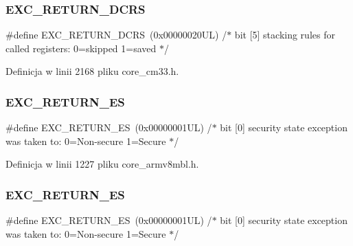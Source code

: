\subsubsection{\texorpdfstring{E\+X\+C\+\_\+\+R\+E\+T\+U\+R\+N\+\_\+\+D\+C\+RS}{EXC\_RETURN\_DCRS}\hspace{0.1cm}{\footnotesize\ttfamily [4/4]}}
{\footnotesize\ttfamily \#define E\+X\+C\+\_\+\+R\+E\+T\+U\+R\+N\+\_\+\+D\+C\+RS~(0x00000020\+U\+L)     /$\ast$ bit \mbox{[}5\mbox{]} stacking rules for called registers\+: 0=skipped 1=saved       $\ast$/}



Definicja w linii 2168 pliku core\+\_\+cm33.\+h.

\mbox{\label{group___c_m_s_i_s___core___n_v_i_c_functions_gac939dbf69d3063c76a28516a4ae84db7}} 
\subsubsection{\texorpdfstring{E\+X\+C\+\_\+\+R\+E\+T\+U\+R\+N\+\_\+\+ES}{EXC\_RETURN\_ES}\hspace{0.1cm}{\footnotesize\ttfamily [1/4]}}
{\footnotesize\ttfamily \#define E\+X\+C\+\_\+\+R\+E\+T\+U\+R\+N\+\_\+\+ES~(0x00000001\+U\+L)     /$\ast$ bit \mbox{[}0\mbox{]} security state exception was taken to\+: 0=\+Non-\/secure 1=\+Secure $\ast$/}



Definicja w linii 1227 pliku core\+\_\+armv8mbl.\+h.

\mbox{\label{group___c_m_s_i_s___core___n_v_i_c_functions_gac939dbf69d3063c76a28516a4ae84db7}} 
\subsubsection{\texorpdfstring{E\+X\+C\+\_\+\+R\+E\+T\+U\+R\+N\+\_\+\+ES}{EXC\_RETURN\_ES}\hspace{0.1cm}{\footnotesize\ttfamily [2/4]}}
{\footnotesize\ttfamily \#define E\+X\+C\+\_\+\+R\+E\+T\+U\+R\+N\+\_\+\+ES~(0x00000001\+U\+L)     /$\ast$ bit \mbox{[}0\mbox{]} security state exception was taken to\+: 0=\+Non-\/secure 1=\+Secure $\ast$/}



